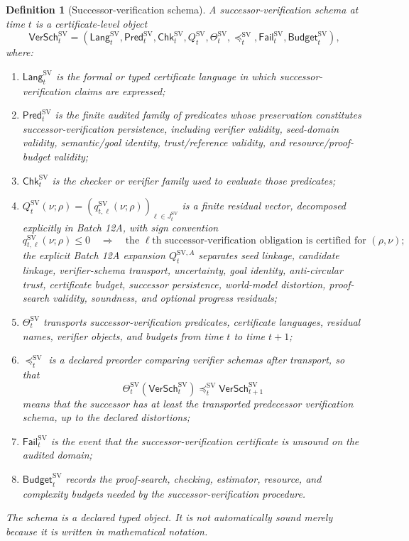 \documentclass[11pt]{article}
\newtheorem{definition}[theorem]{Definition}
\newcommand{\1}{\mathbf{1}}
\begin{document}
\begin{definition}[Successor-verification schema]
\label{def:batch12_successor_verification_schema}
A successor-verification schema at time \(t\) is a certificate-level object
\[
\mathsf{VerSch}_t^{\mathrm{SV}}
=
(\mathsf{Lang}_t^{\mathrm{SV}},
 \mathsf{Pred}_t^{\mathrm{SV}},
 \mathsf{Chk}_t^{\mathrm{SV}},
 Q_t^{\mathrm{SV}},
 \Theta_t^{\mathrm{SV}},
 \preceq_t^{\mathrm{SV}},
 \mathsf{Fail}_t^{\mathrm{SV}},
 \mathsf{Budget}_t^{\mathrm{SV}}),
\]
where:
\begin{enumerate}[label=(\roman*),leftmargin=1.5em]
    \item \(\mathsf{Lang}_t^{\mathrm{SV}}\) is the formal or typed certificate language in which successor-verification claims are expressed;
    \item \(\mathsf{Pred}_t^{\mathrm{SV}}\) is the finite audited family of predicates whose preservation constitutes successor-verification persistence, including verifier validity, seed-domain validity, semantic/goal identity, trust/reference validity, and resource/proof-budget validity;
    \item \(\mathsf{Chk}_t^{\mathrm{SV}}\) is the checker or verifier family used to evaluate those predicates;
    \item \(Q_t^{\mathrm{SV}}(\nu;\rho)=(q_{t,\ell}^{\mathrm{SV}}(\nu;\rho))_{\ell\in J_t^{\mathrm{SV}}}\) is a finite residual vector, decomposed explicitly in Batch 12A, with sign convention
    \[
    q_{t,\ell}^{\mathrm{SV}}(\nu;\rho)\le0
    \quad\Longrightarrow\quad
    \text{the }\ell\text{th successor-verification obligation is certified for }(\rho,\nu);
    \]
    the explicit Batch 12A expansion \(Q_t^{\mathrm{SV},A}\) separates seed linkage, candidate linkage, verifier-schema transport, uncertainty, goal identity, anti-circular trust, certificate budget, successor persistence, world-model distortion, proof-search validity, soundness, and optional progress residuals;
    \item \(\Theta_t^{\mathrm{SV}}\) transports successor-verification predicates, certificate languages, residual names, verifier objects, and budgets from time \(t\) to time \(t+1\);
    \item \(\preceq_t^{\mathrm{SV}}\) is a declared preorder comparing verifier schemas after transport, so that
    \[
    \Theta_t^{\mathrm{SV}}(\mathsf{VerSch}_t^{\mathrm{SV}})
    \preceq_t^{\mathrm{SV}}
    \mathsf{VerSch}_{t+1}^{\mathrm{SV}}
    \]
    means that the successor has at least the transported predecessor verification schema, up to the declared distortions;
    \item \(\mathsf{Fail}_t^{\mathrm{SV}}\) is the event that the successor-verification certificate is unsound on the audited domain;
    \item \(\mathsf{Budget}_t^{\mathrm{SV}}\) records the proof-search, checking, estimator, resource, and complexity budgets needed by the successor-verification procedure.
\end{enumerate}
The schema is a declared typed object.  It is not automatically sound merely because it is written in mathematical notation.
\end{definition}
\end{document}
